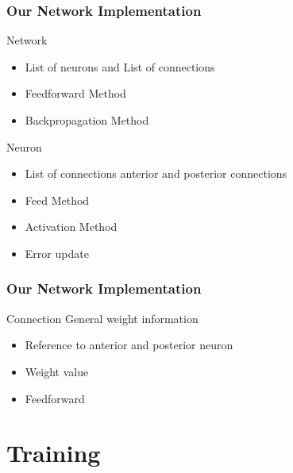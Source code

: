 \documentclass{beamer}
\begin{document}

\begin{frame}
\frametitle{Our Network Implementation}
\begin{block}{Network}
    \begin{itemize}
        \item List of neurons and List of connections
        \item Feedforward Method
        \item Backpropagation Method
    \end{itemize}
\end{block}

\begin{block}{Neuron}
    \begin{itemize}
        \item List of connections anterior and posterior connections
        \item Feed Method
        \item Activation Method
        \item Error update
    \end{itemize}
\end{block}
\end{frame}


\begin{frame}
\frametitle{Our Network Implementation}
\begin{block}{Connection}
    General weight information
    \begin{itemize}
        \item Reference to anterior and posterior neuron
        \item Weight value
        \item Feedforward
    \end{itemize}
\end{block}
\end{frame}
\section{Training}
\end{document}
